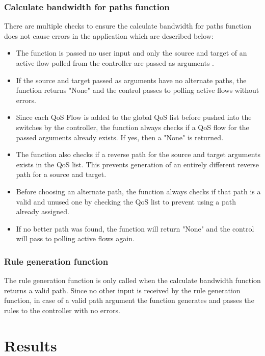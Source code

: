 \documentclass[paper=a4, fontsize=12pt]{scrartcl}	%
\numberwithin{equation}{section}		%
\numberwithin{figure}{section}			%
\numberwithin{table}{section}				%
\begin{document}
\subsubsection{Calculate bandwidth for paths function}
There are multiple checks to ensure the calculate bandwidth for paths function does not cause errors in the application which are described below:
\begin{itemize}
\item The function is passed no user input and only the source and target of an active flow polled from the controller are passed as arguments .
\item If the source and target passed as arguments have no alternate paths, the function returns "None" and the control passes to polling active flows without errors.
\item Since each QoS Flow is added to the global QoS list before pushed into the switches by the controller, the function always checks if a QoS flow for the passed arguments already exists. If yes, then a "None" is returned.
\item The function also checks if a reverse path for the source and target arguments exists in the QoS list. This prevents generation of an entirely different reverse path for a source and target. 
\item Before choosing an alternate path, the function always checks if that path is a valid and unused one by checking the QoS list to prevent using a path already assigned.
\item If no better path was found, the function will return "None" and the control will pass to polling active flows again.
\end{itemize}

\subsubsection{Rule generation function}
The rule generation function is only called when the calculate bandwidth function returns a valid path. Since no other input is received by the rule generation function, in case of a valid path argument the function generates and passes the rules to the controller with no errors.

\section{Results}
\end{document}
